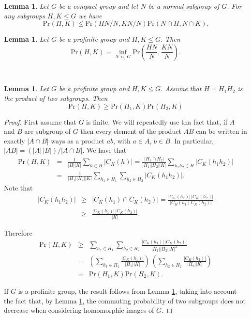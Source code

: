 \documentclass[10pt,a4paper]{amsart}
\newtheorem{lemma}[theorem]{\bf Lemma}
\newcommand{\pr }{\mathrm{Pr} }
\begin{document}
\begin{lemma}\label{quot} 
 Let $G$ be a compact group and let $N$ be a normal subgroup of  $G$.  For any subgroups $H,K\leq G$ we have 
\[\pr(H,K)\leq \pr(HN/N,KN/N)\pr(N\cap H,N\cap K).\]
\end{lemma}

\begin{lemma}\label{limit} 
Let $G$ be a profinite group and $H, K \le G$.  Then 
\[ \pr(H,K) = \inf_{N \lhd_o G} \pr \left(\frac{HN}{N},\frac{KN}{N}\right).\]
\end{lemma}\

\begin{lemma}\label{prod} 
Let $G$ be a profinite group and $H, K \le G$. Assume that $H=H_1H_2$ is the product of two subgroups. Then
\[\pr(H,K)\ge\pr(H_1,K)\pr(H_2,K)\]
\end{lemma}

\begin{proof} First assume that $G$ is finite. We will repeatedly use tha fact that, if $A$ and $B$ are subgroup of $G$ then every element of the product $AB$ %
can be written in exactly $|A\cap B|$ ways as a product $ab$, with $a\in A$, $b\in B$. In particular, $|AB|= (|A|\,|B|)/|A\cap B|$. 
We have that
\begin{eqnarray*}
\pr(H,K)
&=&
\frac{1}{|H||K|}
\sum_{h\in H} |C_K(h)|
 = %
\frac{|H_1\cap H_2|}{|H_1||H_2||K|}\sum_{h_1h_2\in H} |C_K(h_1h_2)|\\
&=&
\frac{1}{|H_1||H_2||K|}\sum_{h_1\in H_1}\sum_{h_2\in H_2}
|C_K(h_1h_2)|.
\end{eqnarray*}
 Note that 
 \begin{eqnarray*}
|C_K(h_1h_2)| &\ge& |C_K(h_1)\cap C_K(h_2)|=\frac{|C_K(h_1)|\,|C_K(h_2)|}{|C_K(h_1)C_K(h_2)|} \\
&\ge& \frac{|C_K(h_1)|\,|C_K(h_2)|}{|K|}.
\end{eqnarray*}

Therefore 
 \begin{eqnarray*}
\pr(H,K) &\ge &\sum_{h_1\in H_1}\sum_{h_2\in H_2}\frac{|C_K(h_1)|\,|C_K(h_2)|}{|H_1||H_2||K|^2}\\
 &=& \left(\sum_{h_1\in H_1}\frac{|C_K(h_1)|}{|H_1||K|}\right)\,\left(\sum_{h_2\in H_2}\frac{|C_K(h_2)|}{|H_2||K|}\right) \\
 &=& \pr(H_1,K)\pr(H_2,K).
\end{eqnarray*}

If $G$ is a profinite group, the result follows from Lemma \ref{limit}, taking into account the fact that, by Lemma \ref{quot}, the commuting 
probability of two subgroups does not decrease when considering homomorphic images of $G$.
\end{proof}
\end{document}
